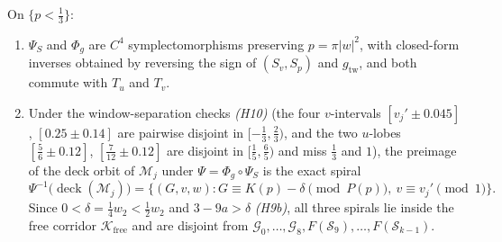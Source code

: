\begin{proposition}\label{prop:twists}
On $\{p<\frac13\}$:
\begin{enumerate}[label=(\roman*)]
\item $\Psi_S$ and $\Phi_g$ are $C^4$ symplectomorphisms preserving $p=\pi|w|^2$, with closed-form inverses obtained by
reversing the sign of $(S_v,S_p)$ and $g_{\mathrm{tw}}$, and both commute with $T_u$ and $T_v$.
\item Under the window-separation checks \emph{(H10)} (the four $v$-intervals $[v_j'\pm0.045]$, $[0.25\pm0.14]$ are
pairwise disjoint in $[-\frac13,\frac23)$, and the two $u$-lobes $[\frac56\pm0.12]$, $[\frac7{12}\pm0.12]$ are disjoint
in $[\frac15,\frac65)$ and miss $\frac13$ and $1$), the preimage of the deck orbit of $\mathcal M_j$ under
$\Psi=\Phi_g\circ\Psi_S$ is the exact spiral
\begin{equation}\label{eq:spiral}
 \Psi^{-1}\bigl(\operatorname{deck}(\mathcal M_j)\bigr)
 = \bigl\{(G,v,w): G\equiv K(p)-\delta\pmod{P(p)},\ v\equiv v_j'\pmod1\bigr\}.
\end{equation}
Since $0<\delta=\frac14w_2<\frac12w_2$ and $3-9a>\delta$ \emph{(H9b)}, all three spirals lie inside the free corridor
$\mathcal K_{\mathrm{free}}$ and are disjoint from $\mathcal G_0,\dots,\mathcal G_8,F(\mathcal S_9),\dots,F(\mathcal S_{k-1})$.
\end{enumerate}
\end{proposition}

